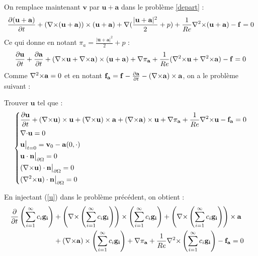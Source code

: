 On remplace maintenant $\mathbf{v}$ par $\mathbf{u}+\mathbf{a}$ dans le problème \ref{depart} :
\[ \frac{\partial(\mathbf{u}+\mathbf{a})}{\partial t}+({\nabla\times}(\mathbf{u}+\mathbf{a}))\times(\mathbf{u}+\mathbf{a}) + {\nabla} (\frac{|\mathbf{u}+\mathbf{a}|^2}{2}+p) + \frac{1}{Re}{\nabla^2\times}(\mathbf{u}+\mathbf{a}) - \mathbf{f} = 0 \]
Ce qui donne en notant $\pi_a=\frac{|\mathbf{u}+\mathbf{a}|^2}{2}+p$ :
\[ \frac{\partial \mathbf{u}}{\partial t}+\frac{\partial \mathbf{a}}{\partial t} + ({\nabla\times} \mathbf{u}+{\nabla\times} \mathbf{a})\times(\mathbf{u}+\mathbf{a}) + {\nabla}\pi_{\mathbf{a}} + \frac{1}{Re}({\nabla^2\times} \mathbf{u}+{\nabla^2\times} \mathbf{a}) - \mathbf{f} = 0 \]
Comme ${\nabla^2\times} \mathbf{a} = 0$ et en notant $\mathbf{f_a}=\mathbf{f}-\frac{\partial \mathbf{a}}{\partial t} - ({\nabla\times} \mathbf{a})\times \mathbf{a}$, on a le problème suivant :
\begin{pb}\label{pbu}
Trouver $\mathbf{u}$ tel que :
\begin{equation*}
\left\{\begin{aligned}
&\frac{\partial \mathbf{u}}{\partial t} + ({\nabla\times} \mathbf{u})\times \mathbf{u} + ({\nabla\times} \mathbf{u})\times \mathbf{a} +({\nabla\times} \mathbf{a})\times \mathbf{u} + {\nabla} \pi_{\mathbf{a}} +\frac{1}{Re}{\nabla^2\times}  \mathbf{u} - \mathbf{f_a} = 0\\
&{\nabla\cdot} \mathbf{u} = 0\\
&\mathbf{u}\big\rvert_{t=0} = \mathbf{v}_0 - \mathbf{a}(0,\cdot)\\
&\mathbf{u}\cdot \mathbf{n}{\big\rvert_{\partial\Omega}} = 0\\
&({\nabla\times} \mathbf{u})\cdot \mathbf{n}{\big\rvert_{\partial\Omega}} = 0\\
&({\nabla^2\times}  \mathbf{u})\cdot \mathbf{n}{\big\rvert_{\partial\Omega}} = 0
\end{aligned}\right.
\end{equation*}\end{pb}

En injectant (\ref{u}) dans le problème précédent, on obtient :
\begin{align*}
\frac{\partial}{\partial t}\left(\sum_{i=1}^\infty c_i\mathbf{g_i}\right) &+ \left({\nabla\times} \left(\sum_{i=1}^\infty c_i\mathbf{g_i}\right)\right)\times \left(\sum_{i=1}^\infty c_i\mathbf{g_i}\right) + \left({\nabla\times} \left(\sum_{i=1}^\infty c_i\mathbf{g_i}\right)\right)\times \mathbf{a}&\\
&+ ({\nabla\times} \mathbf{a})\times \left(\sum_{i=1}^\infty c_i\mathbf{g_i}\right) + {\nabla} \pi_{\mathbf{a}} +\frac{1}{Re}{\nabla^2\times}  \left(\sum_{i=1}^\infty c_i\mathbf{g_i}\right) - \mathbf{f_a} =0\\
\end{align*}

